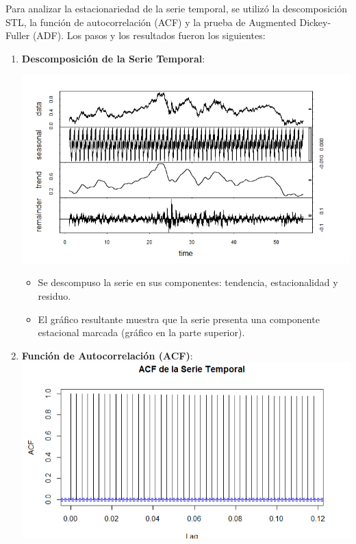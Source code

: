 \documentclass[
]{book}
\begin{document}
Para analizar la estacionariedad de la serie temporal, se utilizó la descomposición STL, la función de autocorrelación (ACF) y la prueba de Augmented Dickey-Fuller (ADF). Los pasos y los resultados fueron los siguientes:

\begin{enumerate}
\def\labelenumi{\arabic{enumi}.}
\item
  \textbf{Descomposición de la Serie Temporal}:

  \includegraphics{images/clipboard-2193911821.png}

  \begin{itemize}
  \item
    Se descompuso la serie en sus componentes: tendencia, estacionalidad y residuo.
  \item
    El gráfico resultante muestra que la serie presenta una componente estacional marcada (gráfico en la parte superior).
  \end{itemize}
\item
  \textbf{Función de Autocorrelación (ACF)}:\\
  \includegraphics{images/clipboard-928318317.png}


\end{enumerate}
\end{document}
